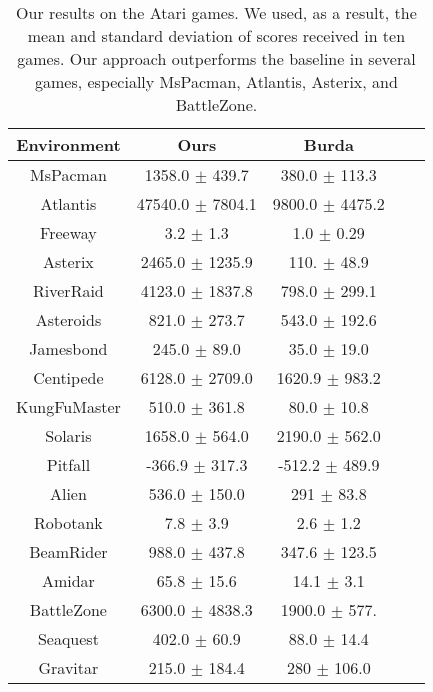 \begin{table}[htb]
\centering
\begin{tabular}{ccccc}
\hline
Environment       & Ours                  & Burda \\ \hline
MsPacman     &  1358.0 $\pm$ 439.7 & 380.0 $\pm$ 113.3   \\ 
Atlantis   &         47540.0 $\pm$ 7804.1               &   9800.0 $\pm$ 4475.2                          \\
Freeway    &             3.2 $\pm$ 1.3                &     1.0 $\pm$ 0.29                               \\
Asterix    &           2465.0 $\pm$ 1235.9               &      110. $\pm$ 48.9                        \\
RiverRaid  &             4123.0 $\pm$ 1837.8               &    798.0 $\pm$ 299.1                        \\
Asteroids  &            821.0 $\pm$ 273.7              &        543.0 $\pm$ 192.6                          \\
Jamesbond  &                245.0 $\pm$ 89.0               &        35.0 $\pm$ 19.0                           \\
Centipede  &                6128.0 $\pm$ 2709.0               &      1620.9 $\pm$ 983.2                          \\
KungFuMaster     &              510.0 $\pm$ 361.8               &     80.0 $\pm$ 10.8                         \\
Solaris    &                 1658.0 $\pm$ 564.0               &       2190.0 $\pm$ 562.0                 \\
Pitfall    &              -366.9 $\pm$ 317.3               &        -512.2 $\pm$ 489.9                             \\
Alien      &                536.0 $\pm$ 150.0               &         291 $\pm$ 83.8                            \\
Robotank   &               7.8 $\pm$ 3.9                 &           2.6 $\pm$ 1.2                    \\
BeamRider  &            988.0 $\pm$ 437.8                &          347.6 $\pm$ 123.5                              \\
Amidar     &            65.8 $\pm$ 15.6                 &          14.1 $\pm$ 3.1                        \\
BattleZone &            6300.0 $\pm$ 4838.3                 &   1900.0 $\pm$ 577.                                     \\
Seaquest   &            402.0 $\pm$ 60.9                   &         88.0 $\pm$ 14.4                           \\
Gravitar   &            215.0 $\pm$ 184.4                 &        280 $\pm$ 106.0                      \\ \hline
\end{tabular}
\caption{Our results on the Atari games. We used, as a result, the mean and standard deviation of scores received in ten games. Our approach outperforms the baseline in several games, especially MsPacman, Atlantis, Asterix, and BattleZone.}
\label{tab:tabela_resultados}
\end{table}


